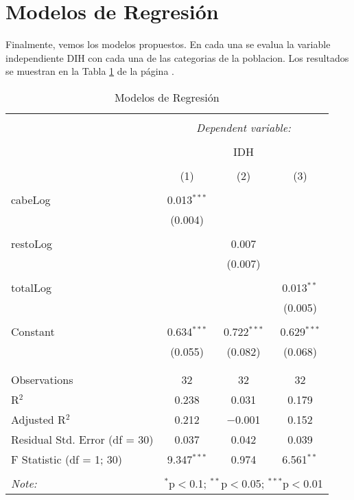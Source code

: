 \section{Modelos de Regresión}

Finalmente, vemos los modelos propuestos. En cada una se evalua la variable independiente DIH con cada una de las categorias de la poblacion. Los resultados se muestran en la Tabla \ref{regresiones} de la página \pageref{regresiones}.


\begin{table}[!htbp] \centering 
  \caption{Modelos de Regresión} 
  \label{regresiones} 
\begin{tabular}{@{\extracolsep{5pt}}lccc} 
\\[-1.8ex]\hline 
\hline \\[-1.8ex] 
 & \multicolumn{3}{c}{\textit{Dependent variable:}} \\ 
\cline{2-4} 
\\[-1.8ex] & \multicolumn{3}{c}{IDH} \\ 
\\[-1.8ex] & (1) & (2) & (3)\\ 
\hline \\[-1.8ex] 
 cabeLog & 0.013$^{***}$ &  &  \\ 
  & (0.004) &  &  \\ 
  & & & \\ 
 restoLog &  & 0.007 &  \\ 
  &  & (0.007) &  \\ 
  & & & \\ 
 totalLog &  &  & 0.013$^{**}$ \\ 
  &  &  & (0.005) \\ 
  & & & \\ 
 Constant & 0.634$^{***}$ & 0.722$^{***}$ & 0.629$^{***}$ \\ 
  & (0.055) & (0.082) & (0.068) \\ 
  & & & \\ 
\hline \\[-1.8ex] 
Observations & 32 & 32 & 32 \\ 
R$^{2}$ & 0.238 & 0.031 & 0.179 \\ 
Adjusted R$^{2}$ & 0.212 & $-$0.001 & 0.152 \\ 
Residual Std. Error (df = 30) & 0.037 & 0.042 & 0.039 \\ 
F Statistic (df = 1; 30) & 9.347$^{***}$ & 0.974 & 6.561$^{**}$ \\ 
\hline 
\hline \\[-1.8ex] 
\textit{Note:}  & \multicolumn{3}{r}{$^{*}$p$<$0.1; $^{**}$p$<$0.05; $^{***}$p$<$0.01} \\ 
\end{tabular} 
\end{table} 


















\endinput
